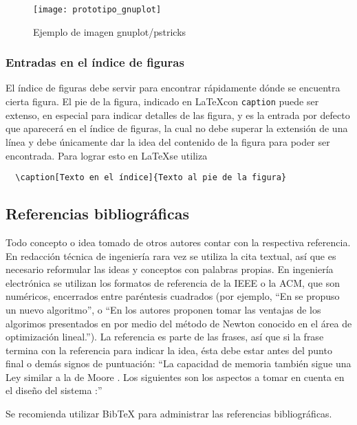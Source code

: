 \begin{figure}[htb]
  \centering
  \texttt{[image: prototipo\_gnuplot]}
  \caption{Ejemplo de imagen gnuplot/pstricks}
  \label{fig:pstricks}
\end{figure}

\subsubsection{Entradas en el índice de figuras}

El índice de figuras debe servir para encontrar rápidamente dónde se encuentra
cierta figura.  El pie de la figura, indicado en \LaTeX con \texttt{caption}
puede ser extenso, en especial para indicar detalles de las figura, y es la
entrada por defecto que aparecerá en el índice de figuras, la cual no debe
superar la extensión de una línea y debe únicamente dar la idea del contenido
de la figura para poder ser encontrada.  Para lograr esto en \LaTeX se utiliza
\begin{verbatim}
  \caption[Texto en el índice]{Texto al pie de la figura}
\end{verbatim}

\subsection{Referencias bibliográficas}

Todo concepto o idea tomado de otros autores contar con la respectiva
referencia. En redacción técnica de ingeniería rara vez se utiliza la cita
textual, así que es necesario reformular las ideas y conceptos con palabras
propias. En ingeniería electrónica se utilizan los formatos de referencia de la
IEEE o la ACM, que son numéricos, encerrados entre paréntesis cuadrados (por
ejemplo, ``En \cite{Davis1963} se propuso un nuevo algoritmo'', o ``En
\cite{ProakisManolakis1998} los autores proponen tomar las ventajas de los
algorimos presentados en \cite{Oppenheim1998,Roberts2005,Haykin2001} por medio
del método de Newton \cite{Burrus1998} conocido en el área de optimización
lineal.''). La referencia es parte de las frases, así que si la frase termina
con la referencia para indicar la idea, ésta debe estar antes del punto final o
demás signos de puntuación: ``La capacidad de memoria también sigue una Ley
similar a la de Moore \cite{Octave}. Los siguientes son los aspectos a tomar en
cuenta en el diseño del sistema \cite{Lindner2002}:''

Se recomienda utilizar BibTeX para administrar las referencias bibliográficas.


